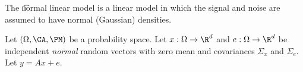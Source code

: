 


The \t{normal linear model} is a linear model in which the signal and noise are assumed to have normal (Gaussian) densities.

Let $(\Omega, \CA, \PM)$ be a probability space.
Let $x: \Omega \to \R^d$ and $e: \Omega \to \R^d$ be independent \textit{normal} random vectors with zero mean and covariances $\Sigma_{x}$ and $\Sigma_e$.
Let $y = Ax + e$.

\blankpage
